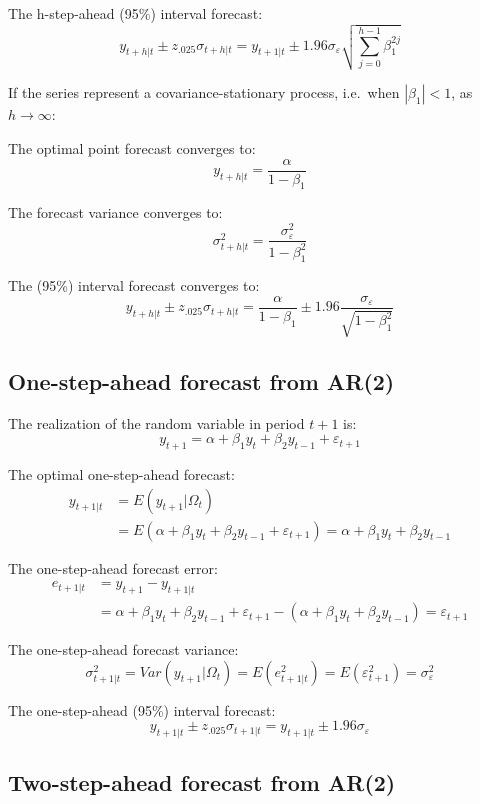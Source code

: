 \documentclass[
  12pt,
  oneside]{book}
\begin{document}
The h-step-ahead (95\%) interval forecast: \[y_{t+h|t} \pm z_{.025}\sigma_{t+h|t} = y_{t+1|t} \pm 1.96\sigma_{\varepsilon}\sqrt{\textstyle\sum_{j=0}^{h-1}\beta_1^{2j}}\]

If the series represent a covariance-stationary process, i.e.~when \(|\beta_1| < 1\), as \(h \to \infty\):

The optimal point forecast converges to: \[y_{t+h|t} = \frac{\alpha}{1-\beta_1}\]

The forecast variance converges to: \[\sigma_{t+h|t}^2 = \frac{\sigma_{\varepsilon}^2}{1-\beta_1^2}\]

The (95\%) interval forecast converges to: \[y_{t+h|t} \pm z_{.025}\sigma_{t+h|t} = \frac{\alpha}{1-\beta_1} \pm 1.96\frac{\sigma_{\varepsilon}}{\sqrt{1-\beta_1^2}}\]

\hypertarget{one-step-ahead-forecast-from-ar2}{%
\subsection{One-step-ahead forecast from AR(2)}\label{one-step-ahead-forecast-from-ar2}}

The realization of the random variable in period \(t+1\) is: \[y_{t+1} = \alpha + \beta_1 y_{t} + \beta_2 y_{t-1} + \varepsilon_{t+1}\]

The optimal one-step-ahead forecast:
\[\begin{aligned}
y_{t+1|t} &= E(y_{t+1}|\Omega_t) \\
&= E(\alpha + \beta_1 y_{t} + \beta_2 y_{t-1} + \varepsilon_{t+1}) = \alpha + \beta_1 y_{t} + \beta_2 y_{t-1}
\end{aligned}\]

The one-step-ahead forecast error:
\[\begin{aligned}
e_{t+1|t} &= y_{t+1} - y_{t+1|t} \\
&= \alpha + \beta_1 y_t + \beta_2 y_{t-1} + \varepsilon_{t+1} - (\alpha + \beta_1 y_t + \beta_2 y_{t-1}) = \varepsilon_{t+1}
\end{aligned}\]

The one-step-ahead forecast variance: \[\sigma_{t+1|t}^2 = Var(y_{t+1}|\Omega_t) = E(e_{t+1|t}^2) = E(\varepsilon_{t+1}^2) = \sigma_{\varepsilon}^2\]

The one-step-ahead (95\%) interval forecast: \[y_{t+1|t} \pm z_{.025}\sigma_{t+1|t} = y_{t+1|t} \pm 1.96\sigma_{\varepsilon}\]

\hypertarget{two-step-ahead-forecast-from-ar2}{%
\subsection{Two-step-ahead forecast from AR(2)}\label{two-step-ahead-forecast-from-ar2}}
\end{document}

